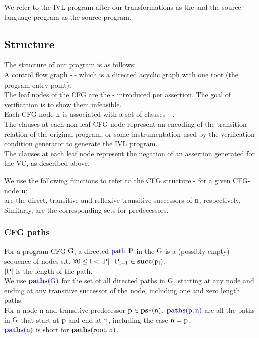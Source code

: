 
\noindent
We refer to the IVL program after our transformations as the  and the source language program as the source program. 

\subsection*{Structure}
The structure of our program is as follows:\\
A control flow graph -  - which is a directed acyclic graph with one root (the program entry point).\\
The leaf nodes of the CFG are the  - introduced per assertion. The goal of verification is to show them infeasible.\\
Each CFG-node $\mathrm{n}$ is associated with a set of clauses - .\\ 
The clauses at each non-leaf CFG-node represent an encoding of the transition relation of the original program, or some instrumentation used by the verification condition generator to generate the IVL program.\\
The clauses at each leaf node represent the negation of an assertion generated for the VC, as described above.

\noindent
We use the following functions to refer to the CFG structure - for a given CFG-node $\mathrm{n}$:\\
 are the direct, transitive and reflexive-transitive successors of $\mathrm{n}$, respectively.\\
Similarly,  are the corresponding sets for predecessors.

\subsubsection*{CFG paths}
For a program CFG $\mathrm{G}$, a directed $\textcolor{blue}{\mathrm{path}}$ $\mathrm{P}$ in the $\mathrm{G}$ is a (possibly empty) sequence of nodes s.t. 
$\mathrm{\forall 0 \leq i < \left|\mathrm{P}\right| \cdot P_{i+1} \in \mathbf{succ}(\mathrm{p_i})}$.\\
$\left|\mathrm{P}\right|$ is the length of the path.\\
We use $\newdef{\paths{G}{}}$ for the set of all directed paths in $\mathrm{G}$, starting at any node and ending at any transitive successor of the node, including one and zero length paths.\\
For a node n and transitive predecessor $\mathrm{p \in \mathbf{ps*}(\mathrm{n})}$,
$\newdef{\paths{p}{n}}$ are all the paths in $\mathrm{G}$ that start at $\mathrm{p}$ and end at $\mathrm{n}$, including the case $\mathrm{n=p}$.\\
$\newdef{\paths{n}{}}$ is short for $\paths{root}{n}$.

